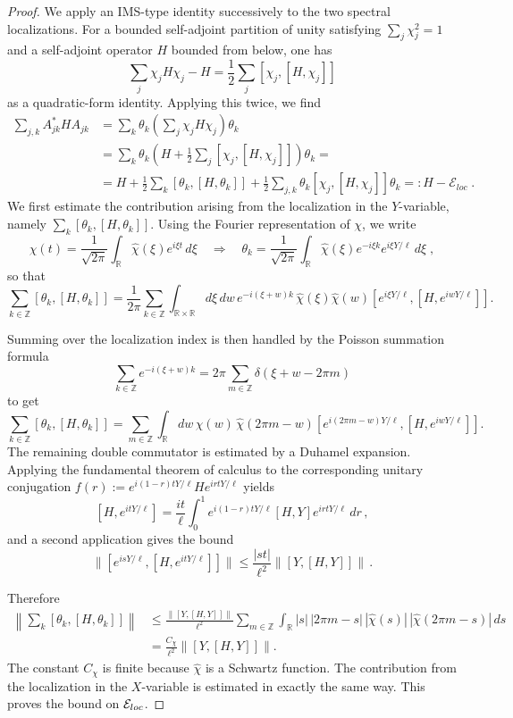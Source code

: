 \documentclass[10pt,a4paper]{amsart}
\newcommand{\R}{\mathbb R}
\newcommand{\Z}{\mathbb Z}
\begin{document}
\begin{proof}
We apply an IMS-type identity successively to the two spectral localizations. For a bounded self-adjoint partition of unity satisfying $\sum_j\chi_j^2=1$ and a self-adjoint operator $H$ bounded from below, one has
\[
 \sum_j\chi_j H\chi_j - H
 =
 \frac12\sum_j[\chi_j,[H,\chi_j]]
\]
as a quadratic-form identity. Applying this twice, we find
\begin{align*}
   \sum_{j,k}A_{jk}^*HA_{jk}
 &=\sum_k\theta_k\left(\sum_j\chi_jH\chi_j\right)\theta_k \\
 &=\sum_k\theta_k \left(H + \frac{1}{2}\sum_{j}\left[\chi_j,[H, \chi_j]\right]\right)\theta_k = \\
 &= H + \frac{1}{2}\sum_{k}\left[\theta_k,[H, \theta_k]\right] + \frac{1}{2}\sum_{j,k} \theta_k\left[\chi_j,[H, \chi_j]\right] \theta_k =: H - \mathcal{E}_{loc}\;.
\end{align*}
We first estimate the contribution arising from the localization in the $Y$-variable, namely $\sum_k [\theta_k,[H,\theta_k]]$.
Using the Fourier representation of $\chi$, we write
\[
 \chi(t)=\frac1{\sqrt{2\pi}}
 \int_{\R}\widehat\chi(\xi)e^{i \xi t}\,d\xi \quad\Longrightarrow\quad \theta_k
 =
 \frac1{\sqrt{2\pi}}
 \int_{\R}\widehat\chi(\xi) e^{-i \xi k}e^{i \xi Y/\ell}\,d\xi\;,
\]
so that
\[
\sum_{k \in \Z} [\theta_k,[H,\theta_k]] = \frac{1}{2\pi}\sum_{k \in \mathbb{Z}}\int_{\mathbb{R}\times\mathbb{R}}d\xi\,dw\,e^{-i(\xi + w) k}\,\hat{\chi}(\xi)\hat{\chi}(w)  \left[e^{i\xi Y/\ell}, \left[H, e^{i w Y/\ell}\right]  \right] .
\]

Summing over the localization index is then handled by the Poisson summation formula
\[
 \sum_{k\in\Z}e^{-i(\xi+w)k}
 =
 2\pi\sum_{m\in\Z}\delta(\xi+w-2\pi m)
\]
to get
\[
\sum_{k \in \Z} [\theta_k,[H,\theta_k]] = \sum_{m \in \Z}\int_{\R}dw\,\hat{\chi}(w)\,\hat{\chi}(2\pi m - w)\left[e^{i(2 \pi m - w) Y / \ell}, \left[H, e^{i w Y/ \ell}\right]  \right].
\]
The remaining double commutator is estimated by a Duhamel expansion. Applying the fundamental theorem of calculus to the corresponding unitary conjugation $f(r) := e^{i(1-r)tY/\ell}He^{irtY/\ell}$ yields
\[
 [H,e^{itY/\ell}]
 =
 \frac{it}{\ell}
 \int_0^1
 e^{i(1-r)tY/\ell}[H,Y]e^{irtY/\ell}\,dr\,,
\]
and a second application gives the bound
\[
 \|[e^{isY/\ell},[H,e^{itY/\ell}]]\|
 \le
 \frac{|st|}{\ell^2}\|[Y,[H,Y]]\|\,.
\]

Therefore
\begin{align*}
 \left\|\sum_k[\theta_k,[H,\theta_k]]\right\|
 &\le
 \frac{\|[Y,[H,Y]]\|}{\ell^2}
 \sum_{m\in\Z}\int_{\R}
 |s|\,|2\pi m-s|\,
 |\widehat\chi(s)|\,|\widehat\chi(2\pi m-s)|\,ds\\
 &=\frac{C_{\chi}}{\ell^2}
 \|[Y,[H,Y]]\|.
\end{align*}
The constant $C_\chi$ is finite because $\widehat\chi$ is a Schwartz function. The contribution from the localization in the $X$-variable is estimated in exactly the same way. This proves the bound on $\mathcal E_{\rm loc}$.


\end{proof}
\end{document}
